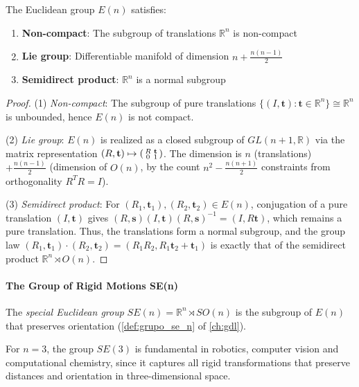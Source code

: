 \begin{proposition}[Properties of $E(n)$]
The Euclidean group $E(n)$ satisfies:
\begin{enumerate}
    \item \textbf{Non-compact}: The subgroup of translations $\mathbb{R}^n$ is non-compact
    \item \textbf{Lie group}: Differentiable manifold of dimension $n + \frac{n(n-1)}{2}$
    \item \textbf{Semidirect product}: $\mathbb{R}^n$ is a normal subgroup
\end{enumerate}
\end{proposition}

\begin{proof}
(1) \textit{Non-compact}: The subgroup of pure translations $\{(I, \mathbf{t}) : \mathbf{t} \in \mathbb{R}^n\} \cong \mathbb{R}^n$ is unbounded, hence $E(n)$ is not compact.

(2) \textit{Lie group}: $E(n)$ is realized as a closed subgroup of $GL(n+1, \mathbb{R})$ via the matrix representation $(R, \mathbf{t}) \mapsto \begin{psmallmatrix} R & \mathbf{t} \\ 0 & 1 \end{psmallmatrix}$. The dimension is $n$ (translations) $+ \frac{n(n-1)}{2}$ (dimension of $O(n)$, by the count $n^2 - \frac{n(n+1)}{2}$ constraints from orthogonality $R^TR = I$).

(3) \textit{Semidirect product}: For $(R_1, \mathbf{t}_1), (R_2, \mathbf{t}_2) \in E(n)$, conjugation of a pure translation $(I, \mathbf{t})$ gives $(R, \mathbf{s})(I, \mathbf{t})(R, \mathbf{s})^{-1} = (I, R\mathbf{t})$, which remains a pure translation. Thus, the translations form a normal subgroup, and the group law $(R_1, \mathbf{t}_1) \cdot (R_2, \mathbf{t}_2) = (R_1 R_2, R_1 \mathbf{t}_2 + \mathbf{t}_1)$ is exactly that of the semidirect product $\mathbb{R}^n \rtimes O(n)$.
\end{proof}

\paragraph{The Group of Rigid Motions SE(n)}

The \textit{special Euclidean group} $SE(n) = \mathbb{R}^n \rtimes SO(n)$ is the subgroup of $E(n)$ that preserves orientation (\autoref{def:grupo_se_n} of \autoref{ch:gdl}).\label{def:grupo_se_n_cnn}

For $n = 3$, the group $SE(3)$ is fundamental in robotics, computer vision and computational chemistry, since it captures all rigid transformations that preserve distances and orientation in three-dimensional space.


